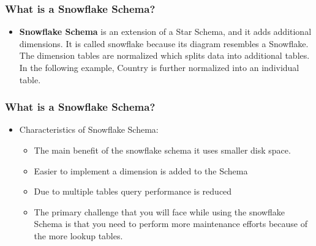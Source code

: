 \begin{frame}
\frametitle{What is a Snowflake Schema?}
	\begin{itemize}
		\item \textbf{Snowflake Schema} is an extension of a Star Schema, and it adds additional dimensions. It is called snowflake because its diagram resembles a Snowflake. The dimension tables are normalized which splits data into additional tables. In the following example, Country is further normalized into an individual table.
	\end{itemize}
\end{frame}

\begin{frame}
\frametitle{What is a Snowflake Schema?}
\begin{itemize}
	\item Characteristics of Snowflake Schema:
	\begin{itemize}
		\item The main benefit of the snowflake schema it uses smaller disk space.
		\item Easier to implement a dimension is added to the Schema
		\item Due to multiple tables query performance is reduced
		\item The primary challenge that you will face while using the snowflake Schema is that you need to perform more maintenance efforts because of the more lookup tables.
	\end{itemize}
\end{itemize}
\end{frame}


